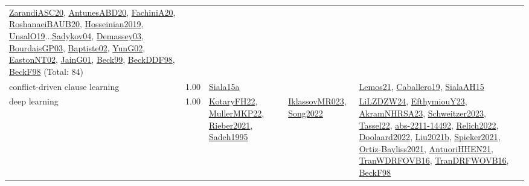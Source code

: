 {\begin{longtable}{p{3cm}r>{\raggedright\arraybackslash}p{6cm}>{\raggedright\arraybackslash}p{6cm}>{\raggedright\arraybackslash}p{8cm}}
\hyperref[detail:ZarandiASC20]{ZarandiASC20}, \hyperref[detail:AntunesABD20]{AntunesABD20}, \hyperref[detail:FachiniA20]{FachiniA20}, \hyperref[detail:RoshanaeiBAUB20]{RoshanaeiBAUB20}, \hyperref[detail:Hosseinian2019]{Hosseinian2019}, \hyperref[detail:UnsalO19]{UnsalO19}...\hyperref[detail:Sadykov04]{Sadykov04}, \hyperref[detail:Demassey03]{Demassey03}, \hyperref[detail:BourdaisGP03]{BourdaisGP03}, \hyperref[detail:Baptiste02]{Baptiste02}, \hyperref[detail:YunG02]{YunG02}, \hyperref[detail:EastonNT02]{EastonNT02}, \hyperref[detail:JainG01]{JainG01}, \hyperref[detail:Beck99]{Beck99}, \hyperref[detail:BeckDDF98]{BeckDDF98}, \hyperref[detail:BeckF98]{BeckF98} (Total: 84)\\
\index{conflict-driven clause learning}\index{Algorithms!conflict-driven clause learning}conflict-driven clause learning &  1.00 & \hyperref[detail:Siala15a]{Siala15a} &  & \hyperref[detail:Lemos21]{Lemos21}, \hyperref[detail:Caballero19]{Caballero19}, \hyperref[detail:SialaAH15]{SialaAH15}\\
\index{deep learning}\index{Algorithms!deep learning}deep learning &  1.00 & \hyperref[detail:KotaryFH22]{KotaryFH22}, \hyperref[detail:MullerMKP22]{MullerMKP22}, \hyperref[detail:Rieber2021]{Rieber2021}, \hyperref[detail:Sadeh1995]{Sadeh1995} & \hyperref[detail:IklassovMR023]{IklassovMR023}, \hyperref[detail:Song2022]{Song2022} & \hyperref[detail:LiLZDZW24]{LiLZDZW24}, \hyperref[detail:EfthymiouY23]{EfthymiouY23}, \hyperref[detail:AkramNHRSA23]{AkramNHRSA23}, \hyperref[detail:Schweitzer2023]{Schweitzer2023}, \hyperref[detail:Tassel22]{Tassel22}, \hyperref[detail:abs-2211-14492]{abs-2211-14492}, \hyperref[detail:Relich2022]{Relich2022}, \hyperref[detail:Doolaard2022]{Doolaard2022}, \hyperref[detail:Liu2021b]{Liu2021b}, \hyperref[detail:Spieker2021]{Spieker2021}, \hyperref[detail:Ortiz-Bayliss2021]{Ortiz-Bayliss2021}, \hyperref[detail:AntuoriHHEN21]{AntuoriHHEN21}, \hyperref[detail:TranWDRFOVB16]{TranWDRFOVB16}, \hyperref[detail:TranDRFWOVB16]{TranDRFWOVB16}, \hyperref[detail:BeckF98]{BeckF98}\\

\end{longtable}}
